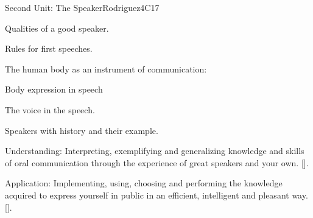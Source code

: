 \begin{syllabus}
\begin{unit}{}{Second Unit: The Speaker}{Rodriguez}{4}{C17}
\begin{topics}
	\item Qualities of a good speaker.
	\item Rules for first speeches.
	\item The human body as an instrument of communication:
		\begin{subtopics}
			\item Body expression in speech
			\item The voice in the speech.
	   	\end{subtopics}
	\item Speakers with history and their example.
\end{topics}
\begin{learningoutcomes}
	\item Understanding: Interpreting, exemplifying and generalizing knowledge and skills of oral communication through the experience of great speakers and your own. [\Usage].
	\item Application: Implementing, using, choosing and performing the knowledge acquired to express yourself in public in an efficient, intelligent and pleasant way. [\Usage].
\end{learningoutcomes}
\end{unit}


\end{syllabus}
